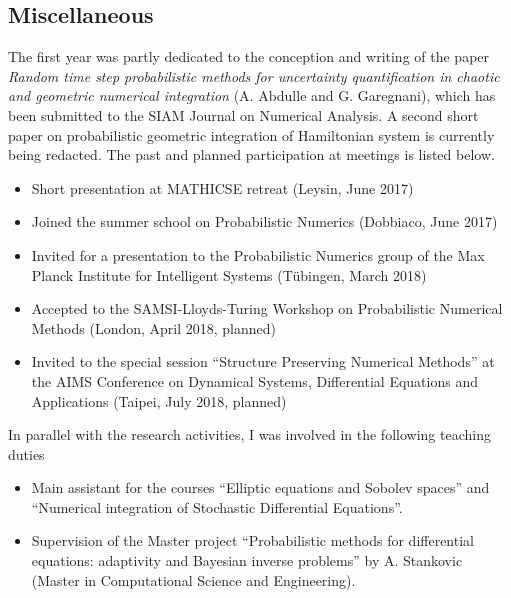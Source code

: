 \documentclass{scrartcl}
\theoremstyle{theorem}
\theoremstyle{definition}
\begin{document}
	\subsection*{Miscellaneous}
	The first year was partly dedicated to the conception and writing of the paper \textit{Random time step probabilistic methods for uncertainty quantification in chaotic and geometric numerical integration} (A. Abdulle and G. Garegnani), which has been submitted to the SIAM Journal on Numerical Analysis. A second short paper on probabilistic geometric integration of Hamiltonian system is currently being redacted. The past and planned participation at meetings is listed below.
	\begin{itemize}[label=-]
		\item Short presentation at MATHICSE retreat (Leysin, June 2017)
		\item Joined the summer school on Probabilistic Numerics (Dobbiaco, June 2017)
		\item Invited for a presentation to the Probabilistic Numerics group of the Max Planck Institute for Intelligent Systems (Tübingen, March 2018)
		\item Accepted to the SAMSI-Lloyds-Turing Workshop on Probabilistic Numerical Methods (London, April 2018, planned)
		\item Invited to the special session ``Structure Preserving Numerical Methods'' at the AIMS Conference on Dynamical Systems, Differential Equations and Applications (Taipei, July 2018, planned)
	\end{itemize}
	In parallel with the research activities, I was involved in the following teaching duties
	\begin{itemize}[label=-]
		\item Main assistant for the courses ``Elliptic equations and Sobolev spaces'' and ``Numerical integration of Stochastic Differential Equations''.
		\item Supervision of the Master project ``Probabilistic methods for differential equations: adaptivity and Bayesian inverse problems'' by A. Stankovic (Master in Computational Science and Engineering).
	\end{itemize}
	
	
\end{document}
